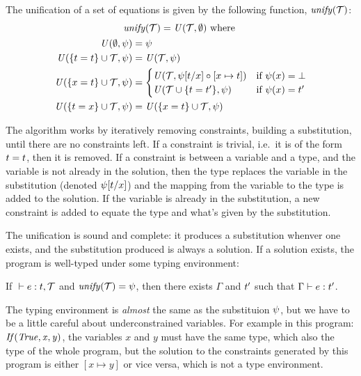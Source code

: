 The unification of a set of equations is given by the following
function, $\mathit{unify}(\mathcal{T})$:
\begin{gather*}
\mathit{unify}(\mathcal{T}) = \mathit{U}(\mathcal{T},\emptyset)\mbox{ where } \\
\begin{align}
\mathit{U}(\emptyset,\psi) &= \psi\\
\mathit{U}(\{t = t\}\cup\mathcal{T},\psi) &= \mathit{U}(\mathcal{T},\psi)\\
\mathit{U}(\{x  = t\}\cup\mathcal{T},\psi) &= 
\begin{cases}
\mathit{U}(\mathcal{T},\psi[t/x] \circ [x \mapsto t]) & \mbox{if }\psi(x) = \bot\\
\mathit{U}(\mathcal{T} \cup \{ t=t' \},\psi) & \mbox{if }\psi(x) = t'\\
\end{cases}\\
\mathit{U}(\{t = x\}\cup\mathcal{T},\psi) &= 
\mathit{U}(\{x  = t\}\cup\mathcal{T},\psi) 
\end{align}
\end{gather*}

The algorithm works by iteratively removing constraints, building a
substitution, until there are no constraints left.  If a constraint is
trivial, i.e.~it is of the form $t = t$, then it is removed.
If a constraint is between a variable and a type, and the variable is
not already in the solution, then the type replaces the variable in
the substitution (denoted $\psi[t/x]$) and the mapping
from the variable to the type is added to the solution.  If the
variable is already in the substitution, a new constraint is added to
equate the type and what's given by the substitution.

The unification is sound and complete: it produces a substitution
whenver one exists, and the substitution produced is always a
solution.  If a solution exists, the program is well-typed under some
typing environment:
\begin{claim}
If ${\relax}\vdash{e}:{t,\mathcal{T}}$ and $\mathit{unify}(\mathcal{T}) =
\psi$, then there exists $\Gamma$ and $t'$ such that
${\Gamma}\vdash{e}:{t'}$.
\end{claim}

The typing environment is \emph{almost} the same as the substituion
$\psi$, but we have to be a little careful about underconstrained
variables.  For example in this program:
$\mathit{If}(\mathit{True},\mathit{x},\mathit{y})$, the variables $\mathit{x}$ and
$\mathit{y}$ must have the same type, which also the type of the whole
program, but the solution to the constraints generated by this program
is either $[\mathit{x}\mapsto\mathit{y}]$ or vice versa, which is not
a type environment.

